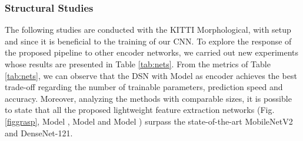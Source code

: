 \documentclass[5p]{elsarticle}
\begin{document}
\subsubsection{Structural Studies}

The following studies are conducted with the KITTI Morphological, with setup  and  since it is beneficial to the training of our CNN. To explore the response of the proposed pipeline to other encoder networks, we carried out new experiments whose results are presented in Table \ref{tab:nets}. From the metrics of Table \ref{tab:nets}, we can observe that the DSN with Model  as encoder achieves the best trade-off regarding the number of trainable parameters, prediction speed and accuracy. Moreover, analyzing the methods with comparable sizes, it is possible to state that all the proposed lightweight feature extraction networks (Fig. \ref{figgrasp}, Model , Model  and Model ) surpass the state-of-the-art MobileNetV2 and DenseNet-121.
\end{document}
